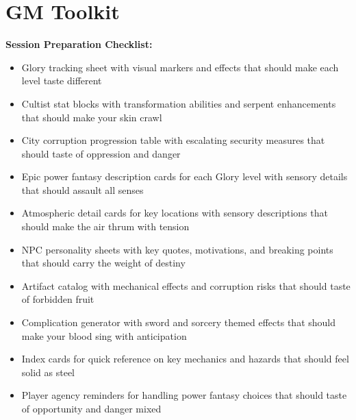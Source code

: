 \documentclass[11pt]{article}
\newcommand{\cmark}{\ding{51}}%
\begin{document}
\section{GM Toolkit}

\textbf{Session Preparation Checklist:}
\begin{itemize}
\item [\cmark] Glory tracking sheet with visual markers and effects that should make each level taste different
\item [\cmark] Cultist stat blocks with transformation abilities and serpent enhancements that should make your skin crawl
\item [\cmark] City corruption progression table with escalating security measures that should taste of oppression and danger
\item [\cmark] Epic power fantasy description cards for each Glory level with sensory details that should assault all senses
\item [\cmark] Atmospheric detail cards for key locations with sensory descriptions that should make the air thrum with tension
\item [\cmark] NPC personality sheets with key quotes, motivations, and breaking points that should carry the weight of destiny
\item [\cmark] Artifact catalog with mechanical effects and corruption risks that should taste of forbidden fruit
\item [\cmark] Complication generator with sword and sorcery themed effects that should make your blood sing with anticipation
\item [\cmark] Index cards for quick reference on key mechanics and hazards that should feel solid as steel
\item [\cmark] Player agency reminders for handling power fantasy choices that should taste of opportunity and danger mixed
\end{itemize}
\end{document}
